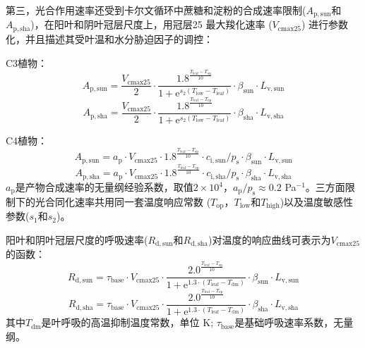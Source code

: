 第三，光合作用速率还受到卡尔文循环中蔗糖和淀粉的合成速率限制($A_{\mathrm{p,sun}}$和$A_{\mathrm{p,sha}}$)，在阳叶和阴叶冠层尺度上，用冠层25 \textcelsius 最大羧化速率 ($V_{\mathrm{cmax25}}$) 进行参数化，并且描述其受叶温和水分胁迫因子的调控：

C3植物：
\begin{equation}\label{A_e_a_sun}
A_{\mathrm{p,sun}}=\frac{V_{\mathrm{cmax 25}}}{2} \cdot \frac{1.8^{\frac{T_{\mathrm{{leaf }}}-T_{\mathrm{o p}}}{10}}}{1+{\mathrm e}^{s_{\mathrm{2}}\left(T_{\mathrm{{low }}}-T_{\mathrm{{leaf }}}\right)}} \cdot \beta_{\mathrm{sun}} \cdot L_{\mathrm{v,sun}}
\end{equation}
\begin{equation}\label{A_e_a_sha}
A_{\mathrm{p,sha}}=\frac{V_{\mathrm{cmax 25}}}{2} \cdot \frac{1.8^{\frac{T_{\mathrm{{leaf }}}-T_{\mathrm{o p}}}{10}}}{1+{\mathrm e}^{s_{\mathrm{2}}\left(T_{\mathrm{{low }}}-T_{\mathrm{{leaf }}}\right)}} \cdot \beta_{\mathrm{sha}} \cdot L_{\mathrm{v,sha}}
\end{equation}

C4植物：
\begin{equation}\label{A_e_b_sun}
A_{\mathrm{p,sun}}=a_{\mathrm{p}} \cdot V_{\mathrm{cmax 25}} \cdot 1.8^{\frac{T_{\mathrm{{leaf }}}-T_{\mathrm{op}}}{10}} \cdot c_{\mathrm{i,sun}}/p_{\mathrm{s}} \cdot \beta_{\mathrm{sun}} \cdot L_{\mathrm{v,sun}}
\end{equation}
\begin{equation}\label{A_e_b_sha}
A_{\mathrm{p,sha}}=a_{\mathrm{p}} \cdot V_{\mathrm{cmax 25}} \cdot 1.8^{\frac{T_{\mathrm{{leaf }}}-T_{\mathrm{op}}}{10}} \cdot c_{\mathrm{i,sha}}/p_{\mathrm{s}} \cdot \beta_{\mathrm{sha}} \cdot L_{\mathrm{v,sha}}
\end{equation}
$a_{\mathrm{p}}$是产物合成速率的无量纲经验系数，取值$2\times10^4$，$a_{\mathrm{p}}/p_{\mathrm{s}}\approx 0.2$ Pa$^{-1}$。三方面限制下的光合同化速率共用同一套温度响应常数 ($T_{\mathrm{op}}$，$T_{\mathrm{low}}$和$T_{\mathrm{high}}$)以及温度敏感性参数($s_1$和$s_2$)。


阳叶和阴叶冠层尺度的呼吸速率($R_{\mathrm{d,sun}}$和$R_{\mathrm{d,sha}}$)对温度的响应曲线可表示为$V_{\mathrm{cmax25}}$的函数：
\begin{equation}\label{R_d1_sun}
R_{\mathrm{d,sun}}=\tau_{\mathrm{{base }}} \cdot V_{\mathrm{cmax 25}} \cdot \frac{2.0^{\frac{T_{\mathrm{leaf}}-T_{\mathrm{op}}}{10}}}{1+{\mathrm e}^{1.3 \cdot\left(T_{\mathrm{leaf}}-T_{\mathrm{d m}}\right)}} \cdot \beta_{\mathrm{sun}} \cdot L_{\mathrm{v,sun}}
\end{equation}
\begin{equation}\label{R_d1_sha}
R_{\mathrm{d,sha}}=\tau_{\mathrm{{base }}} \cdot V_{\mathrm{cmax 25}} \cdot \frac{2.0^{\frac{T_{\mathrm{leaf}}-T_{\mathrm{op}}}{10}}}{1+{\mathrm e}^{1.3 \cdot\left(T_{\mathrm{leaf}}-T_{\mathrm{d m}}\right)}} \cdot \beta_{\mathrm{sha}} \cdot L_{\mathrm{v,sha}}
\end{equation}
其中$T_{\mathrm{dm}}$是叶呼吸的高温抑制温度常数，单位 K; $\tau_{\mathrm{base}}$是基础呼吸速率系数，无量纲。

